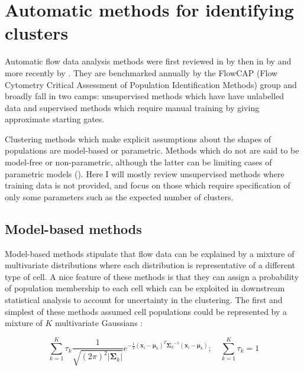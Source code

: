 \section{Automatic methods for identifying clusters}

Automatic flow data analysis methods were first reviewed in \citeyear{Bashashati:2009em} by \citeauthor{Bashashati:2009em} then in \citeyear{Lugli:2010ki} by \citeauthor{Lugli:2010ki}
and more recently by \citet{Aghaeepour:2013dg}.
They are benchmarked annually by the FlowCAP (Flow Cytometry Critical Assessment of Population Identification Methods)
group and broadly fall in two camps:
unsupervised methods which have have unlabelled data
and
supervised methods which require manual training by giving approximate starting gates.

Clustering methods which make explicit assumptions about the shapes of populations are model-based or parametric.
Methods which do not are said to be model-free or non-parametric,
although the latter can be limiting cases of parametric models ().
Here I will mostly review unsupervised methods where training data is not provided,
and focus on those which require specification of only some parameters such as the expected
number of clusters.

\subsection{Model-based methods}

Model-based methods stipulate that flow data can be explained by a mixture of multivariate distributions where each distribution is representative of a different type of cell.
A nice feature of these methods is that they can assign a probability of population membership to each cell which can be exploited in downstream statistical analysis to account for uncertainty in the clustering.
The first and simplest of these methods assumed cell populations could be represented by a mixture of $K$ multivariate Gaussians \citep{Chan:2008gq}:

\[
\sum_{k=1}^K\tau_k \frac{1}{\sqrt{(2\pi)^2|\boldsymbol\Sigma_k|}}
e^{-\frac{1}{2}({\mathbf x_i}-{\boldsymbol\mu_k})^T{\boldsymbol\Sigma_k}^{-1}({\mathbf x_i}-{\boldsymbol\mu_k})
}; \quad \sum_{k=1}^K\tau_k = 1
\]

